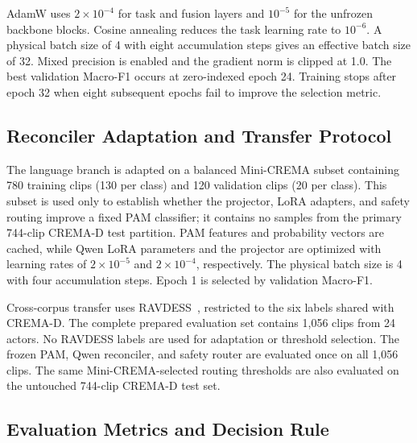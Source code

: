 \documentclass[conference]{IEEEtran}
\begin{document}
AdamW uses $2\times10^{-4}$ for task and fusion layers and $10^{-5}$ for the
unfrozen backbone blocks. Cosine annealing reduces the task learning rate to
$10^{-6}$. A physical batch size of 4 with eight accumulation steps gives an
effective batch size of 32. Mixed precision is enabled and the gradient norm
is clipped at 1.0. The best validation Macro-F1 occurs at zero-indexed epoch
24. Training stops after epoch 32 when eight subsequent epochs fail to improve
the selection metric.

\subsection{Reconciler Adaptation and Transfer Protocol}

The language branch is adapted on a balanced Mini-CREMA subset containing 780
training clips (130 per class) and 120 validation clips (20 per class). This
subset is used only to establish whether the projector, LoRA adapters, and
safety routing improve a fixed PAM classifier; it contains no samples from the
primary 744-clip CREMA-D test partition. PAM features and probability vectors
are cached, while Qwen LoRA parameters and the projector are optimized with
learning rates of $2\times10^{-5}$ and $2\times10^{-4}$, respectively. The
physical batch size is 4 with four accumulation steps. Epoch 1 is selected by
validation Macro-F1.

Cross-corpus transfer uses RAVDESS~\cite{livingstone2018ravdess}, restricted to
the six labels shared with CREMA-D. The complete prepared evaluation set
contains 1,056 clips from 24 actors. No RAVDESS labels are used for adaptation
or threshold selection. The frozen PAM, Qwen reconciler, and safety router are
evaluated once on all 1,056 clips. The same Mini-CREMA-selected routing
thresholds are also evaluated on the untouched 744-clip CREMA-D test set.

\subsection{Evaluation Metrics and Decision Rule}
\end{document}
